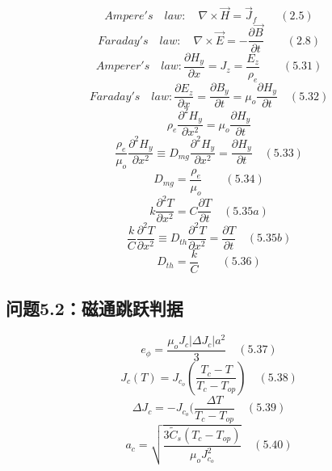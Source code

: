 \begin{equation}%
Ampere's\quad law:\quad \nabla\times\vec{H}=\vec{J}_{f}\qquad(2.5)
\end{equation}
\begin{equation}%
Faraday's\quad law:\quad\nabla\times\vec{E}=-\frac{\partial\vec{B}}{\partial t}\qquad(2.8)
\end{equation}
\begin{equation}%
Amperer's\quad law:\frac{\partial H_{y}}{\partial x}=J_{z}=\frac{E_{z}}{\rho_{e}}\qquad(5.31)
\end{equation}
\begin{equation}%
Faraday's\quad law:\frac{\partial E_{z}}{\partial x}=\frac{\partial B_{y}}{\partial t}=\mu_{o}\frac{\partial H_{y}}{\partial t}\quad(5.32)
\end{equation}
\begin{equation}%
\rho_{e}\frac{\partial^{2}H_{y}}{\partial x^{2}}=\mu_{o}\frac{\partial H_{y}}{\partial t}
\end{equation}
\begin{equation}%
\frac{\rho_{e}}{\mu_{o}}\frac{\partial^{2}H_{y}}{\partial x^{2}}\equiv D_{mg}\frac{\partial^{2}H_{y}}{\partial x^{2}}=\frac{\partial H_{y}}{\partial t}\quad(5.33)
\end{equation}
\begin{equation}%
D_{mg}=\frac{{\rho}_{e}}{\mu_{o}}\qquad(5.34)
\end{equation}
\begin{equation}%
k\frac{\partial^{2}T}{\partial x^{2}}=C\frac{\partial T}{\partial t}\quad(5.35a)
\end{equation}
\begin{equation}%
\frac{k}{C}\frac{\partial^{2}T}{\partial x^{2}}\equiv D_{th}\frac{\partial^{2}T}{\partial x^{2}}=\frac{\partial T}{\partial t}\quad(5.35b)
\end{equation}
\begin{equation}%
D_{th}=\frac{k}{C}\qquad(5.36)
\end{equation}


\subsection{问题5.2：磁通跳跃判据}

\begin{equation}%
e_{\phi}=\frac{\mu_{o}J_{c}|\Delta J_{c}|a^{2}}{3}\quad(5.37)
\end{equation}
\begin{equation}%
J_{c}(T)=J_{c_{o}}(\frac{T_{c}-T}{T_{c}-T_{op}})\quad(5.38)
\end{equation}
\begin{equation}%
\Delta J_{c}=-J_{c_{o}}(\frac{\Delta T}{T_{c}-T_{op}}\quad(5.39)
\end{equation}
\begin{equation}%
a_{c}=\sqrt{\frac{3\tilde{C}_{s}(T_{c}-T_{op})}{\mu_{o}J_{c_{o}}^{2}}}\quad(5.40)
\end{equation}

